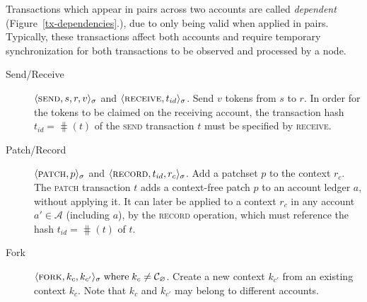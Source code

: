 Transactions which appear in pairs across two accounts are called
\emph{dependent} (Figure~\ref{tx-dependencies}.), due to only being valid when
applied in pairs. Typically, these transactions affect both accounts and
require temporary synchronization for both transactions to be observed and
processed by a node.

\begin{fig}
    \centering
    
\end{fig}

\begin{description}
    \item[Send/Receive] $\langle \text{\normalfont\scshape send}, s, r, v \rangle_{\sigma}$ and
        $\langle \text{\normalfont\scshape receive}, t_{id} \rangle_{\sigma}$. Send $v$ tokens from $s$ to $r$. In
        order for the tokens to be claimed on the receiving account, the
        transaction hash $t_{id} = \hash(t)$ of the \textsc{send} transaction
        $t$ must be specified by \textsc{receive}.
    \item[Patch/Record] $\langle \text{\normalfont\scshape patch}, p \rangle_\sigma$ and $\langle \text{\normalfont\scshape record}, t_{id},
        r_c \rangle_{\sigma}$.  Add a patchset $p$ to the context $r_c$. The
        \textsc{patch} transaction $t$ adds a context-free patch $p$ to an
        account ledger $a$, without applying it. It can later be applied to a
        context $r_c$ in any account $a' \in \mathcal{A}$ (including $a$), by
        the \textsc{record} operation, which must reference the hash $t_{id} =
        \hash(t)$ of $t$.
    \item[Fork] $\langle \text{\normalfont\scshape fork}, k_c, k_{c'} \rangle_\sigma \; \text{where} \; k_c \neq
        \mathcal{C}_{\varnothing}$. Create a new context $k_{c'}$ from an
        existing context $k_c$. Note that $k_c$ and $k_{c'}$ may belong to
        different accounts.
\end{description}
